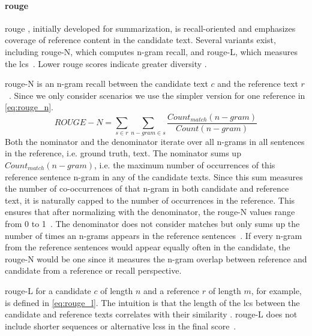 
\paragraph{\ac{rouge}}
\ac{rouge} \citep{lin_rouge_2004}, initially developed for summarization, is recall-oriented and emphasizes coverage of reference content in the candidate text. 
Several variants exist, including \ac{rouge}-N, which computes n-gram recall, and \ac{rouge}-L, which measures the \ac{lcs}~\citep{zhou_paraphrase_2021,palivela_optimization_2021,kurt_pehlivanoglu_comparative_2024}. 
Lower \ac{rouge} scores indicate greater diversity \citep{kurt_pehlivanoglu_comparative_2024}.

\ac{rouge}-N is an n-gram recall between the candidate text $c$ and the reference text $r$~\citep{lin_rouge_2004}.
Since we only consider scenarios we use the simpler version for one reference in \autoref{eq:rouge_n}.
\begin{equation}
    ROUGE-N = \sum_{s \in r}\sum_{n-gram \in s} \frac{Count_{match}(n-gram)}{Count(n-gram)}
\label{eq:rouge_n}
\end{equation}
Both the nominator and the denominator iterate over all n-grams in all sentences in the reference, i.e. ground truth, text.
The nominator sums up $Count_{match}(n-gram)$, i.e. the maximum number of occurrences of this reference sentence n-gram in any of the candidate texts.
Since this sum measures the number of co-occurrences of that n-gram in both candidate and reference text, it is naturally capped to the number of occurrences in the reference.
This ensures that after normalizing with the denominator, the \ac{rouge}-N values range from 0 to 1~\citep{kurt_pehlivanoglu_comparative_2024}.
The denominator does not consider matches but only sums up the number of times an n-grams appears in the reference sentences~\citep{lin_rouge_2004}.
If every n-gram from the reference sentences would appear equally often in the candidate, the \ac{rouge}-N would be one since it measures the n-gram overlap between reference and candidate from a reference or recall perspective.

\ac{rouge}-L for a candidate $c$ of length $n$ and a reference $r$ of length $m$, for example, is defined in \autoref{eq:rouge_l}.
The intuition is that the length of the \ac{lcs} between the candidate and reference texts correlates with their similarity \citep{lin_rouge_2004}.
\ac{rouge}-L does not include shorter sequences or alternative \acp{lcs} in the final score~\citep{lin_rouge_2004}.

